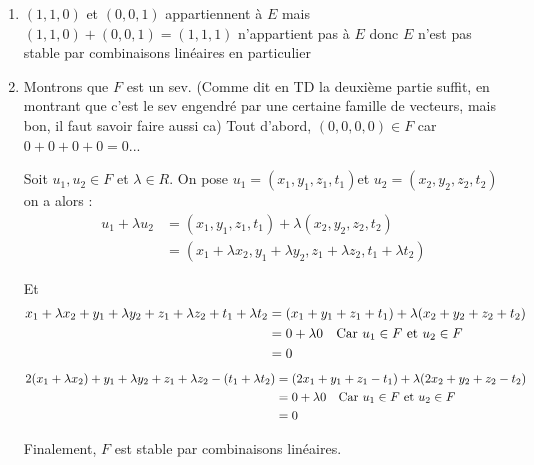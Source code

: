 \documentclass[a4paper, 11pt,reqno]{article}
\begin{document}
\begin{correction}
\begin{enumerate}
\item $(1,1,0)$ et $(0,0,1)$ appartiennent à $E$ mais $(1,1,0)+(0,0,1) = (1,1,1)$ n'appartient pas à $E$ donc $E$ n'est pas stable par combinaisons linéaires en particulier 
\item Montrons que $F$ est un sev. (Comme dit en TD la deuxième partie suffit, en montrant que c'est le sev engendré par une certaine famille de vecteurs, mais bon, il faut savoir faire aussi ca) 
Tout d'abord, $(0,0,0,0)\in F$ car $0+0+0+0=0$...

Soit $u_1, u_2 \in F$ et $\lambda \in R$. On  pose $u_1 =(x_1,y_1,z_1,t_1) $et $u_2 =(x_2,y_2,z_2,t_2) $ on a alors : 
\begin{align*}
u_1 +\lambda u_2 &=(x_1,y_1,z_1,t_1) +\lambda (x_2,y_2,z_2,t_2) \\
								&= (x_1+\lambda x_2,y_1+\lambda y_2,z_1+\lambda z_2,t_1+\lambda t_2) 
\end{align*}

Et 
\begin{align*}
x_1+\lambda x_2 + y_1+\lambda y_2 +z_1+\lambda z_2 + t_1+\lambda t_2 &= (x_1 +y_1+z_1+t_1) +\lambda  (x_2 +y_2+z_2+t_2)\\
&=0 +\lambda 0 \text{\quad Car $u_1\in F$ et $u_2 \in F$}\\
&=0
\end{align*}
\begin{align*}
2(x_1+\lambda x_2) + y_1+\lambda y_2 +z_1+\lambda z_2 -( t_1+\lambda t_2) &= (2x_1 +y_1+z_1-t_1) +\lambda  (2x_2 +y_2+z_2-t_2)\\
&=0 +\lambda 0 \text{\quad Car $u_1\in F$ et $u_2 \in F$}\\
&=0
\end{align*}

Finalement, $F$ est stable par combinaisons linéaires. 


\end{enumerate}
\end{correction}
\end{document}
